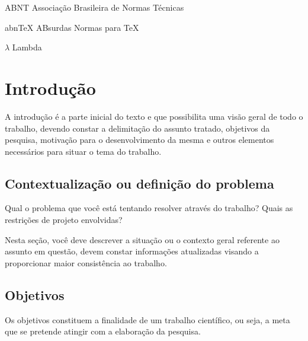 \documentclass[
	12pt,				%
	openright,			%
	oneside,	
	a4paper,				%
	english,				%
	brazil				%
]{abntex2/abntex2} %
\begin{document}
\listoffigures*
\cleardoublepage

\listoftables*
\cleardoublepage

\begin{siglas}
  \item[ABNT] Associação Brasileira de Normas Técnicas
  \item[abnTeX] ABsurdas Normas para TeX
\end{siglas}

\begin{simbolos}
  \item[$ \lambda $] Lambda
\end{simbolos}

\tableofcontents*
\cleardoublepage

\textual

\chapter{Introdução}

	A introdução é a parte inicial do texto e que possibilita uma visão geral de
todo o trabalho, devendo constar a delimitação do assunto tratado, objetivos
da pesquisa, motivação para o desenvolvimento da mesma e outros
elementos necessários para situar o tema do trabalho.

	\section{Contextualização ou definição do problema}
	
		Qual o problema que você está tentando resolver através do trabalho? Quais
		as restrições de projeto envolvidas?

		Nesta seção, você deve descrever a situação ou o contexto geral referente ao
		assunto em questão, devem constar informações atualizadas visando a
		proporcionar maior consistência ao trabalho.

	\section{Objetivos}

		Os objetivos constituem a finalidade de um trabalho científico, ou seja, a
		meta que se pretende atingir com a elaboração da pesquisa.
		
\end{document}
